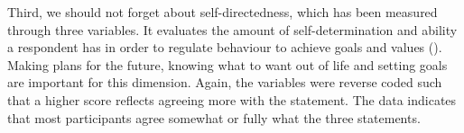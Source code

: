 \documentclass[11pt]{article}
\begin{document}
\begin{table}[h!]
\captionsetup{singlelinecheck=off}
\caption{Harm avoidance distribution}
\end{table}

\begin{table}[h!]
\captionsetup{singlelinecheck=off}
\caption{Harm avoidance distribution}
\end{table}

Third, we should not forget about self-directedness, which has been measured
through three variables. It evaluates the amount of self-determination and ability
a respondent has in order to regulate behaviour to achieve goals and values
(\cite{tse2011}). Making plans for the future, knowing what to want out of life
and setting goals are important for this dimension. Again, the variables were
reverse coded such that a higher score reflects agreeing more with the statement.
The data indicates that most participants agree somewhat or fully what the three
statements.
\end{document}
